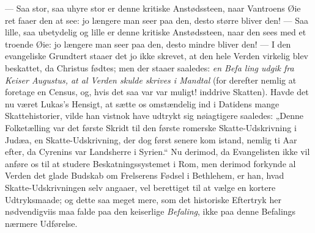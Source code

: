 \documentclass[12pt,a4paper]{book}
\begin{document}
--- Saa stor, saa uhyre stor er denne kritiske Anstødssteen, naar Vantroens Øie
ret faaer den at see: jo længere man seer paa den, desto større bliver den! ---
Saa lille, saa ubetydelig og lille er denne kritiske Anstødssteen, naar den sees
med et troende Øie: jo længere man seer paa den, desto mindre bliver den! --- I
den evangeliske Grundtert staaer det jo ikke skrevet, at den hele Verden virkelig
blev beskattet, da Christus fødtes; men der staaer saaledes: \emph{en Befa\-%
ling udgik fra Keiser Augustus, at al Verden skulde skrives i Mandtal} (for
derefter nemlig at foretage en Census, og, hvis det saa var var muligt! inddrive
Skatten). Havde det nu været Lukas's Hensigt, at sætte os omstændelig ind i
Datidens mange Skattehistorier, vilde han vistnok have udtrykt sig nøiagtigere
saaledes: „Denne Folketælling var det første Skridt til den første romerske
Skatte-Udskrivning i Judæa, en Skatte-Udskrivning, der dog først senere kom
istand, nemlig ti Aar efter, da Cyrenins var Landsherre i Syrien.“ Nu derimod, da
Evangelisten ikke vil anføre os til at studere Beskatningssystemet i Rom, men
derimod forkynde al Verden det glade Budskab om Frelserens Fødsel i Bethlehem, er
han, hvad Skatte-Udskrivningen selv angaaer, vel berettiget til at vælge en
kortere Udtryksmaade; og dette saa meget mere, som det historiske Eftertryk her
nødvendigviis maa falde paa den keiserlige \emph{Befaling}, ikke paa denne
Befalings nærmere Udførelse.
\end{document}
